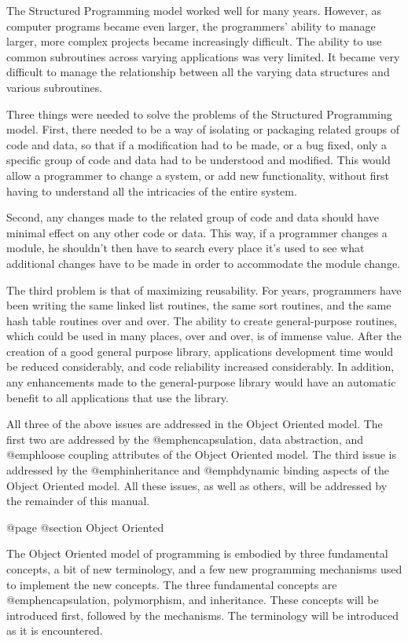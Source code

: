 The Structured Programming model worked well for many years.  However,
as computer programs became even larger, the programmers' ability to
manage larger, more complex projects became increasingly difficult.  The
ability to use common subroutines across varying applications was very
limited.  It became very difficult to manage the relationship between
all the varying data structures and various subroutines.

Three things were needed to solve the problems of the Structured Programming
model.  First, there needed to be a way of isolating or packaging related
groups of code and data, so that if a modification had to be made, or a bug 
fixed, only a specific group of code and data had to be understood and
modified.  This would allow a programmer to change a system, or add new
functionality, without first having to understand all the intricacies of the
entire system.

Second, any changes made to the related group of code and data should
have minimal effect on any other code or data.  This way, if a
programmer changes a module, he shouldn't then have to search every
place it's used to see what additional changes have to be made in order
to accommodate the module change.

The third problem is that of maximizing reusability.  For years,
programmers have been writing the same linked list routines, the same
sort routines, and the same hash table routines over and over.  The
ability to create general-purpose routines, which could be used in many
places, over and over, is of immense value.  After the creation of
a good general purpose library, applications development time would be
reduced considerably, and code reliability increased considerably.
In addition, any enhancements made to the general-purpose library
would have an automatic benefit to all applications that use the library.

All three of the above issues are addressed in the Object Oriented
model.  The first two are addressed by the @emph{encapsulation, data
abstraction}, and @emph{loose coupling} attributes of the Object Oriented
model.  The third issue is addressed by the @emph{inheritance} and
@emph{dynamic binding} aspects of the Object Oriented model.  All these
issues, as well as others, will be addressed by the remainder of this
manual.

@page
@section Object Oriented

The Object Oriented model of programming is embodied by three
fundamental concepts, a bit of new terminology, and a few new
programming mechanisms used to implement the new concepts.  The three
fundamental concepts are @emph{encapsulation, polymorphism, and inheritance}.
These concepts will be introduced first, followed by the mechanisms.
The terminology will be introduced as it is encountered.

